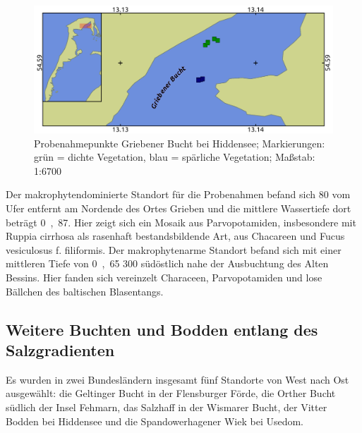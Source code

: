 \begin{figure}[htb]
\centering
\includegraphics[width=1\textwidth]{images/Grieben}
\caption[Probenahmepunkte Griebener Bucht]{Probenahmepunkte Griebener Bucht bei Hiddensee; Markierungen: grün = dichte Vegetation, blau = spärliche Vegetation; Maßstab: 1:6700}
\label{Grieben}
\end{figure}


Der makrophytendominierte Standort für die Probenahmen befand sich \unit{80}{\metre} vom Ufer entfernt am Nordende des Ortes Grieben und die mittlere Wassertiefe dort beträgt \unit{0,87}{\metre}. Hier zeigt sich ein Mosaik aus Parvopotamiden, insbesondere mit Ruppia cirrhosa als rasenhaft bestandsbildende Art, aus Chacareen und Fucus vesiculosus f. filiformis. Der makrophytenarme Standort befand sich mit einer mittleren Tiefe von \unit{0,65}{\metre} \unit{300}{\metre} südöstlich nahe der Ausbuchtung des Alten Bessins. Hier fanden sich vereinzelt Characeen, Parvopotamiden und lose Bällchen des baltischen Blasentangs.



\subsection{Weitere Buchten und Bodden entlang des Salzgradienten}


Es wurden in zwei Bundesländern insgesamt fünf Standorte von West nach Ost ausgewählt: die Geltinger Bucht in der Flensburger Förde, die Orther Bucht südlich der Insel Fehmarn, das Salzhaff in der Wismarer Bucht, der Vitter Bodden bei Hiddensee und die Spandowerhagener Wiek bei Usedom.


